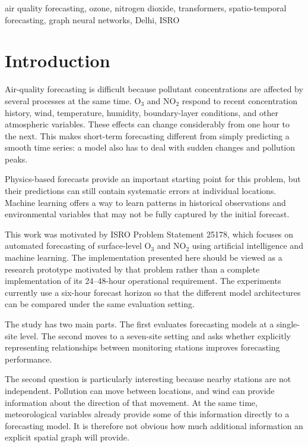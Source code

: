 \documentclass[conference]{IEEEtran}
\begin{document}
\begin{IEEEkeywords}
air quality forecasting, ozone, nitrogen dioxide, transformers,
spatio-temporal forecasting, graph neural networks, Delhi, ISRO
\end{IEEEkeywords}

\section{Introduction}

Air-quality forecasting is difficult because pollutant concentrations are affected by several
processes at the same time. O$_3$ and NO$_2$ respond to recent concentration history, wind,
temperature, humidity, boundary-layer conditions, and other atmospheric variables. These
effects can change considerably from one hour to the next. This makes short-term forecasting
different from simply predicting a smooth time series: a model also has to deal with sudden
changes and pollution peaks.

Physics-based forecasts provide an important starting point for this problem, but their
predictions can still contain systematic errors at individual locations. Machine learning
offers a way to learn patterns in historical observations and environmental variables that may
not be fully captured by the initial forecast.

This work was motivated by ISRO Problem Statement 25178, which focuses on automated forecasting
of surface-level O$_3$ and NO$_2$ using artificial intelligence and machine learning. The
implementation presented here should be viewed as a research prototype motivated by that
problem rather than a complete implementation of its 24--48-hour operational requirement.
The experiments currently use a six-hour forecast horizon so that the different model
architectures can be compared under the same evaluation setting.

The study has two main parts. The first evaluates forecasting models at a single-site level.
The second moves to a seven-site setting and asks whether explicitly representing relationships
between monitoring stations improves forecasting performance.

The second question is particularly interesting because nearby stations are not independent.
Pollution can move between locations, and wind can provide information about the direction of
that movement. At the same time, meteorological variables already provide some of this
information directly to a forecasting model. It is therefore not obvious how much additional
information an explicit spatial graph will provide.
\end{document}
